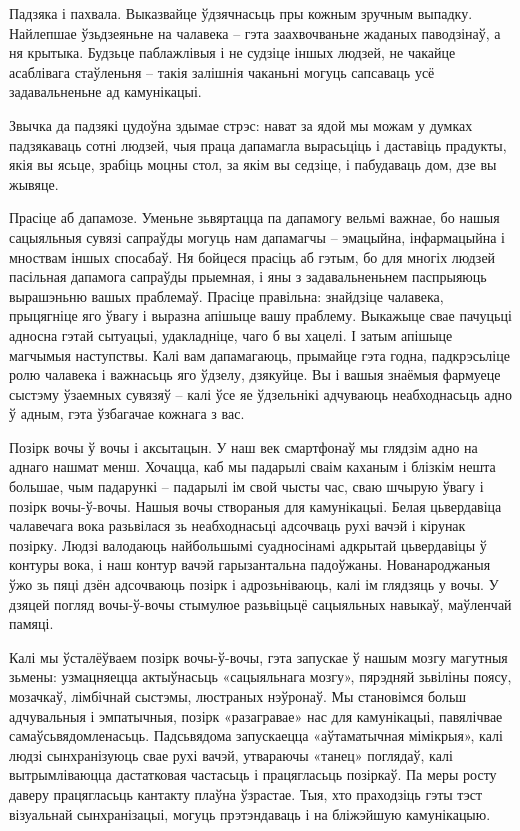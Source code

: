 Падзяка і пахвала. Выказвайце ўдзячнасьць пры кожным зручным выпадку. Найлепшае ўзьдзеяньне на чалавека – гэта заахвочваньне жаданых паводзінаў, а ня крытыка. Будзьце паблажлівыя і не судзіце іншых людзей, не чакайце асаблівага стаўленьня – такія залішнія чаканьні могуць сапсаваць усё задавальненьне ад камунікацыі.

Звычка да падзякі цудоўна здымае стрэс: нават за ядой мы можам у думках падзякаваць сотні людзей, чыя праца дапамагла вырасьціць і даставіць прадукты, якія вы ясьце, зрабіць моцны стол, за якім вы седзіце, і пабудаваць дом, дзе вы жывяце.

Прасіце аб дапамозе. Уменьне зьвяртацца па дапамогу вельмі важнае, бо нашыя сацыяльныя сувязі сапраўды могуць нам дапамагчы – эмацыйна, інфармацыйна і мноствам іншых спосабаў. Ня бойцеся прасіць аб гэтым, бо для многіх людзей пасільная дапамога сапраўды прыемная, і яны з задавальненьнем паспрыяюць вырашэньню вашых праблемаў. Прасіце правільна: знайдзіце чалавека, прыцягніце яго ўвагу і выразна апішыце вашу праблему. Выкажыце свае пачуцьці адносна гэтай сытуацыі, удакладніце, чаго б вы хацелі. І затым апішыце магчымыя наступствы. Калі вам дапамагаюць, прымайце гэта годна, падкрэсьліце ролю чалавека і важнасьць яго ўдзелу, дзякуйце. Вы і вашыя знаёмыя фармуеце сыстэму ўзаемных сувязяў – калі ўсе яе ўдзельнікі адчуваюць неабходнасьць адно ў адным, гэта ўзбагачае кожнага з вас.

Позірк вочы ў вочы і аксытацын. У наш век смартфонаў мы глядзім адно на аднаго нашмат менш. Хочацца, каб мы падарылі сваім каханым і блізкім нешта большае, чым падарункі – падарылі ім свой чысты час, сваю шчырую ўвагу і позірк вочы-ў-вочы. Нашыя вочы створаныя для камунікацыі. Белая цьвердавіца чалавечага вока разьвілася зь неабходнасьці адсочваць рухі вачэй і кірунак позірку. Людзі валодаюць найбольшымі суадносінамі адкрытай цьвердавіцы ў контуры вока, і наш контур вачэй гарызантальна падоўжаны. Нованароджаныя ўжо зь пяці дзён адсочваюць позірк і адрозьніваюць, калі ім глядзяць у вочы. У дзяцей погляд вочы-ў-вочы стымулюе разьвіцьцё сацыяльных навыкаў, маўленчай памяці. 

Калі мы ўсталёўваем позірк вочы-ў-вочы, гэта запускае ў нашым мозгу магутныя зьмены: узмацняецца актыўнасьць «сацыяльнага мозгу», пярэдняй зьвіліны поясу, мозачкаў, лімбічнай сыстэмы, люстраных нэўронаў. Мы становімся больш адчувальныя і эмпатычныя, позірк «разагравае» нас для камунікацыі, павялічвае самаўсьвядомленасьць. Падсьвядома запускаецца «аўтаматычная мімікрыя», калі людзі сынхранізуюць свае рухі вачэй, утвараючы «танец» поглядаў, калі вытрымліваюцца дастатковая частасьць і працягласьць позіркаў. Па меры росту даверу працягласьць кантакту плаўна ўзрастае. Тыя, хто праходзіць гэты тэст візуальнай сынхранізацыі, могуць прэтэндаваць і на бліжэйшую камунікацыю.


